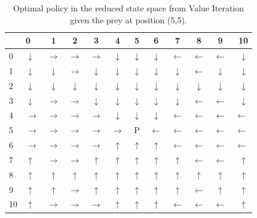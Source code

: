 \documentclass[paper=a4, fontsize=11pt]{scrartcl}
\numberwithin{equation}{section}		%
\numberwithin{figure}{section}			%
\numberwithin{table}{section}				%
\begin{document}
\begin{table}[H]
\caption{Optimal policy in the reduced state space from Value Iteration given the prey at position (5,5).}
\centering
\begin{tabular}{l|l*{9}{c}r}
  \hline
 & 0 & 1 & 2 & 3 & 4 & 5 & 6 & 7 & 8 & 9 & 10 \\ \hline
0 & $\downarrow$& $\rightarrow$& $\rightarrow$& $\rightarrow$& $\downarrow$& $\downarrow$& $\downarrow$& $\leftarrow$& $\leftarrow$& $\leftarrow$& $\downarrow$ \\
1 & $\downarrow$& $\downarrow$& $\rightarrow$& $\downarrow$& $\downarrow$& $\downarrow$& $\downarrow$& $\downarrow$& $\leftarrow$& $\downarrow$& $\downarrow$ \\
2 & $\downarrow$& $\downarrow$& $\downarrow$& $\downarrow$& $\downarrow$& $\downarrow$& $\downarrow$& $\downarrow$& $\downarrow$& $\downarrow$& $\downarrow$ \\
3 & $\downarrow$& $\rightarrow$& $\rightarrow$& $\downarrow$& $\downarrow$& $\downarrow$& $\downarrow$& $\downarrow$& $\leftarrow$& $\leftarrow$& $\downarrow$ \\
4 & $\rightarrow$& $\rightarrow$& $\rightarrow$& $\rightarrow$& $\downarrow$& $\downarrow$& $\downarrow$& $\leftarrow$& $\leftarrow$& $\leftarrow$& $\leftarrow$ \\
5 & $\rightarrow$& $\rightarrow$& $\rightarrow$& $\rightarrow$& $\rightarrow$& P& $\leftarrow$& $\leftarrow$& $\leftarrow$& $\leftarrow$& $\leftarrow$ \\
6 & $\rightarrow$& $\rightarrow$& $\rightarrow$& $\rightarrow$& $\uparrow$& $\uparrow$& $\uparrow$& $\leftarrow$& $\leftarrow$& $\leftarrow$& $\leftarrow$ \\
7 & $\uparrow$& $\rightarrow$& $\rightarrow$& $\uparrow$& $\uparrow$& $\uparrow$& $\uparrow$& $\uparrow$& $\leftarrow$& $\leftarrow$& $\uparrow$ \\
8 & $\uparrow$& $\uparrow$& $\uparrow$& $\uparrow$& $\uparrow$& $\uparrow$& $\uparrow$& $\uparrow$& $\uparrow$& $\uparrow$& $\uparrow$ \\
9 & $\uparrow$& $\uparrow$& $\rightarrow$& $\uparrow$& $\uparrow$& $\uparrow$& $\uparrow$& $\uparrow$& $\leftarrow$& $\uparrow$& $\uparrow$ \\
10 & $\uparrow$& $\rightarrow$& $\rightarrow$& $\rightarrow$& $\uparrow$& $\uparrow$& $\uparrow$& $\leftarrow$& $\leftarrow$& $\leftarrow$& $\uparrow$ \\
\end{tabular}
\label{table:optimalPolicy}
\end{table}
\end{document}
